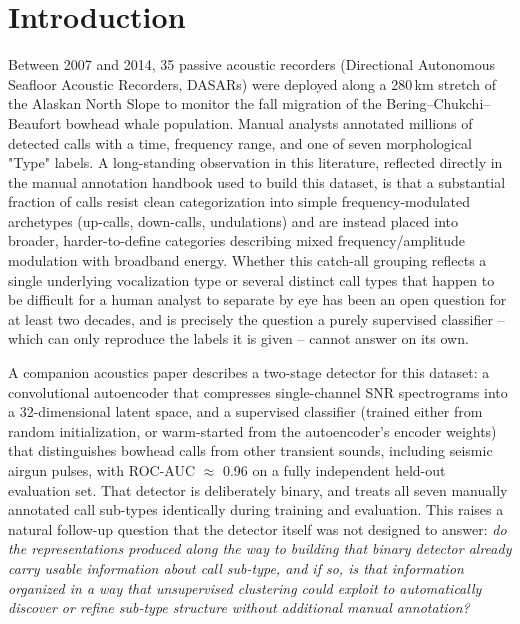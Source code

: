 \documentclass{article}
\begin{document}
\section{Introduction}
\label{sec:intro}

Between 2007 and 2014, 35 passive acoustic recorders (Directional Autonomous
Seafloor Acoustic Recorders, DASARs) were deployed along a 280\,km stretch of
the Alaskan North Slope to monitor the fall migration of the
Bering--Chukchi--Beaufort bowhead whale population. Manual analysts
annotated millions of detected calls with a time, frequency range, and one
of seven morphological "Type" labels. A long-standing observation in this
literature, reflected directly in the manual annotation handbook used to
build this dataset, is that a substantial fraction of calls resist clean
categorization into simple frequency-modulated archetypes (up-calls,
down-calls, undulations) and are instead placed into broader,
harder-to-define categories describing mixed frequency/amplitude
modulation with broadband energy. Whether this catch-all grouping reflects
a single underlying vocalization type or several distinct call types that
happen to be difficult for a human analyst to separate by eye has been an
open question for at least two decades, and is precisely the question a
purely supervised classifier -- which can only reproduce the labels it is
given -- cannot answer on its own.

A companion acoustics paper describes a two-stage detector for this
dataset: a convolutional autoencoder that compresses single-channel SNR
spectrograms into a 32-dimensional latent space, and a supervised
classifier (trained either from random initialization, or warm-started
from the autoencoder's encoder weights) that distinguishes bowhead calls
from other transient sounds, including seismic airgun pulses, with
ROC-AUC $\approx$ 0.96 on a fully independent held-out evaluation set. That
detector is deliberately binary, and treats all seven manually annotated
call sub-types identically during training and evaluation. This raises a
natural follow-up question that the detector itself was not designed to
answer: \emph{do the representations produced along the way to building
that binary detector already carry usable information about call
sub-type, and if so, is that information organized in a way that
unsupervised clustering could exploit to automatically discover or refine
sub-type structure without additional manual annotation?}
\end{document}
